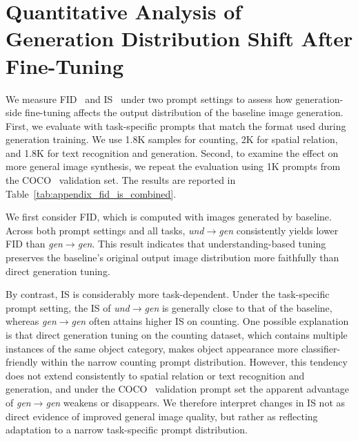 % 

\clearpage
\section{Quantitative Analysis of Generation Distribution Shift After Fine-Tuning}

\label{sec:appendix_gen_results}
\vspace{-20pt}

\vspace{-20pt}

We measure FID~\cite{heusel2017fid} and IS~\cite{salimans2016isscore} under two prompt settings to assess how generation-side fine-tuning affects the output distribution of the baseline image generation. First, we evaluate with task-specific prompts that match the format used during generation training. We use 1.8K samples for counting, 2K for spatial relation, and 1.8K for text recognition and generation. Second, to examine the effect on more general image synthesis, we repeat the evaluation using 1K prompts from the COCO~\cite{lin2014coco} validation set. The results are reported in Table~\ref{tab:appendix_fid_is_combined}.

We first consider FID, which is computed with images generated by baseline. Across both prompt settings and all tasks, \textit{und}$\rightarrow$\textit{gen} consistently yields lower FID than \textit{gen}$\rightarrow$\textit{gen}. This result indicates that understanding-based tuning preserves the baseline's original output image distribution more faithfully than direct generation tuning.

By contrast, IS is considerably more task-dependent. Under the task-specific prompt setting, the IS of \textit{und}$\rightarrow$\textit{gen} is generally close to that of the baseline, whereas \textit{gen}$\rightarrow$\textit{gen} often attains higher IS on counting. One possible explanation is that direct generation tuning on the counting dataset, which contains multiple instances of the same object category, makes object appearance more classifier-friendly within the narrow counting prompt distribution. However, this tendency does not extend consistently to spatial relation or text recognition and generation, and under the COCO~\cite{lin2014coco} validation prompt set the apparent advantage of \textit{gen}$\rightarrow$\textit{gen} weakens or disappears. We therefore interpret changes in IS not as direct evidence of improved general image quality, but rather as reflecting adaptation to a narrow task-specific prompt distribution. 

